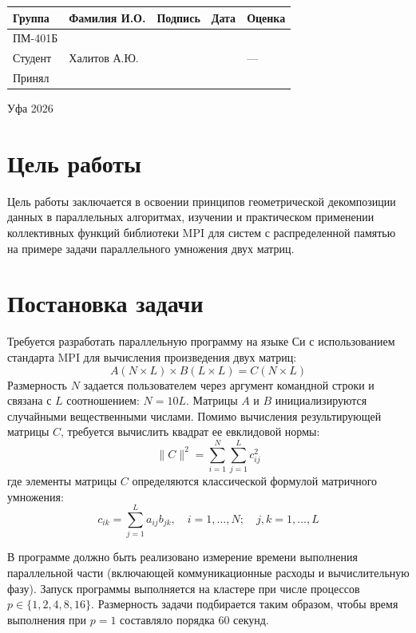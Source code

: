\begin{titlepage}
		\vfill
		\vspace{1cm}
		\noindent
		\begin{table}[H]
			\hspace{-0.8cm}
			\renewcommand{\arraystretch}{1.5} 
			\begin{tabular}{|C{3.1cm}|C{4cm}|C{2.4cm}|C{2.2cm}|C{3.2cm}|}
				\hline
				Группа & Фамилия И.О. & Подпись & Дата & Оценка \\ \hline
				ПМ-401Б & & & & \\ \hline
				Студент & Халитов А.Ю. & & & --- \\ \hline
				Принял &  & & & \\ \hline
			\end{tabular}
		\end{table}
		\vspace{0.25cm}
		Уфа 2026
	\end{titlepage}
	
	\newpage
	
	
	\section{Цель работы}
	Цель работы заключается в освоении принципов геометрической декомпозиции данных в параллельных алгоритмах, изучении и практическом применении коллективных функций библиотеки MPI для систем с распределенной памятью на примере задачи параллельного умножения двух матриц.
	
	\section{Постановка задачи}
	Требуется разработать параллельную программу на языке Си с использованием стандарта MPI для вычисления произведения двух матриц:
	\[ A(N \times L) \times B(L \times L) = C(N \times L) \]
	Размерность $N$ задается пользователем через аргумент командной строки и связана с $L$ соотношением: $N = 10L$. 
	Матрицы $A$ и $B$ инициализируются случайными вещественными числами. Помимо вычисления результирующей матрицы $C$, требуется вычислить квадрат ее евклидовой нормы:
	\[ \|C\|^2 = \sum_{i=1}^{N} \sum_{j=1}^{L} c_{ij}^2 \]
	где элементы матрицы $C$ определяются классической формулой матричного умножения:
	\[ c_{ik} = \sum_{j=1}^{L} a_{ij} b_{jk}, \quad i = 1, \dots, N; \quad j, k = 1, \dots, L \]
	
	В программе должно быть реализовано измерение времени выполнения параллельной части (включающей коммуникационные расходы и вычислительную фазу). Запуск программы выполняется на кластере при числе процессов $p \in \{ 1, 2, 4, 8, 16 \}$. Размерность задачи подбирается таким образом, чтобы время выполнения при $p = 1$ составляло порядка 60 секунд.
	
